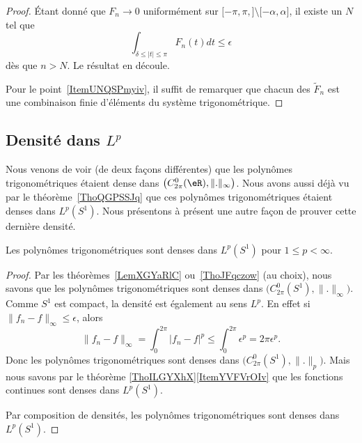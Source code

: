 \begin{proof}
	Étant donné que \( F_n\to 0\) uniformément sur \( \mathopen[ -\pi,\pi ,  \mathclose]\setminus\mathopen[ -\alpha , \alpha \mathclose]\), il existe un \( N\) tel que
	\begin{equation}
		\int_{\delta\leq| t |\leq \pi}F_n(t)dt\leq \epsilon
	\end{equation}
	dès que \( n>N\). Le résultat en découle.

	Pour le point~\ref{ItemUNQSPmyiv}, il suffit de remarquer que chacun des \( \tilde F_n\) est une combinaison finie d'éléments du système trigonométrique.
\end{proof}


\subsection{Densité dans \texorpdfstring{\(  L^p\)}{Lp}}

Nous venons de voir (de deux façons différentes) que les polynômes trigonométriques étaient dense dans \( \big( C^0_{2\pi}(\eR),\| . \|_{\infty} \big)\). Nous avons aussi déjà vu par le théorème~\ref{ThoQGPSSJq} que ces polynômes trigonométriques étaient denses dans \( L^p(S^1)\). Nous présentons à présent une autre façon de prouver cette dernière densité.

\begin{theorem}     \label{ThoDPTwimI}
	Les polynômes trigonométriques sont denses dans \( L^p(S^1)\) pour \( 1\leq p <\infty\).
\end{theorem}

\begin{proof}
	Par les théorèmes~\ref{LemXGYaRlC} ou~\ref{ThoJFqczow} (au choix), nous savons que les polynômes trigonométriques sont denses dans \( \big( C^0_{2\pi}(S^1),\| . \|_{\infty} \big)\). Comme \( S^1\) est compact, la densité est également au sens \( L^p\). En effet si \( \| f_n-f \|_{\infty}\leq \epsilon\), alors
	\begin{equation}
		\| f_n-f \|_{\infty}=\int_0^{2\pi}| f_n-f |^p\leq\int_0^{2\pi}\epsilon^p=2\pi\epsilon^p.
	\end{equation}
	Donc les polynômes trigonométriques sont denses dans \( \big( C^0_{2\pi}(S^1),\| . \|_p \big)\). Mais nous savons par le théorème \ref{ThoILGYXhX}\ref{ItemYVFVrOIv} que les fonctions continues sont denses dans \( L^p(S^1)\).

	Par composition de densités, les polynômes trigonométriques sont denses dans \( L^p(S^1)\).
\end{proof}

